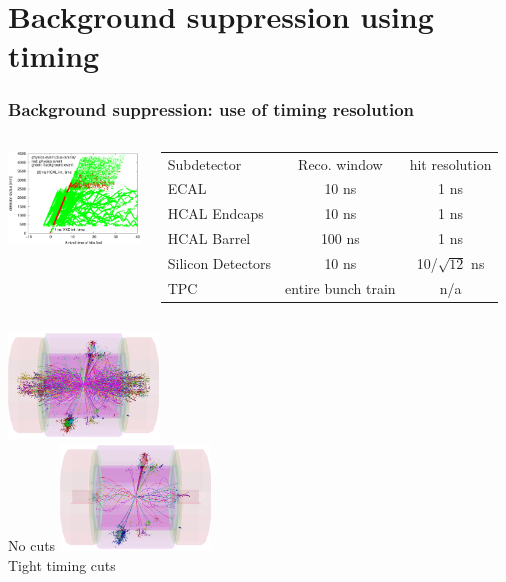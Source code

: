 \documentclass{beamer}
\begin{document}
\section[Bkg suppression]{Background suppression using timing}
\begin{frame}
\frametitle{Background suppression: use of timing resolution}
\begin{columns}[c]
\column{5cm}
\centering
\includegraphics[width=5cm]{Overlayed}
\column{6cm}
{\scriptsize
\begin{tabular}{lcc}
Subdetector &Reco. window & hit resolution\\
ECAL &10 ns& 1 ns\\
HCAL Endcaps &10 ns &1 ns\\
HCAL Barrel &100 ns &1 ns\\
Silicon Detectors &10 ns &10/$\sqrt{12}$ ns\\
TPC &entire bunch train &n/a
\end{tabular}
}
\end{columns}
\begin{columns}[c]
\column{6cm}
\centering
\includegraphics[width=4cm]{EventPictureNoPFOSelector.pdf}\\
No cuts
\column{6cm}
\centering
\includegraphics[width=4cm]{EventPicturePFOSelector.pdf}\\
Tight timing cuts
\end{columns}
\end{frame}
\end{document}
